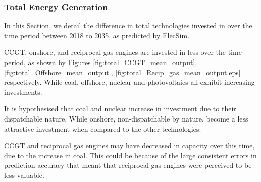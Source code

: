 







\subsubsection{Total Energy Generation}



In this Section, we detail the difference in total technologies invested in over the time period between 2018 to 2035, as predicted by ElecSim.

CCGT, onshore, and reciprocal gas engines are invested in less over the time period, as shown by Figures \ref{fig:total_CCGT_mean_output}, \ref{fig:total_Offshore_mean_output}, \ref{fig:total_Recip_gas_mean_output.eps} respectively. While coal, offshore, nuclear and photovoltaics all exhibit increasing investments.

It is hypothesised that coal and nuclear increase in investment due to their dispatchable nature. While onshore, non-dispatchable by nature, become a less attractive investment when compared to the other technologies.

CCGT and reciprocal gas engines may have decreased in capacity over this time, due to the increase in coal. This could be because of the large consistent errors in prediction accuracy that meant that reciprocal gas engines were perceived to be less valuable.


